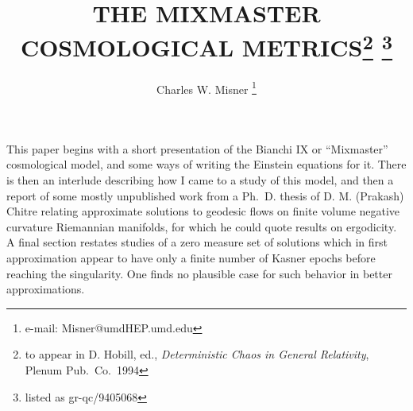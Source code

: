 \newcommand{\longbroken}{--- --- ---}
\newcommand{\chain}{--- $\cdot$ ---}
\newcommand{\dashddot}{--- $\cdot$ $\cdot$ ---}
\newcommand{\full}{------}
\let\lc=\lowercase
\let\uc=\uppercase
\newcommand{\Or}{\mathop{\rm O}\nolimits}
\newcommand{\Tr}{\mathop{\rm Tr}\nolimits}
\newcommand{\tr}{\mathop{\rm tr}\nolimits}
\newcommand{\ts}{\thinspace}
\newcommand{\bs}{\noalign{\vspace{7pt plus2pt minus2pt}}}
\newcommand{\0}{\phantom{0}}
\newcommand{\m}{\llap{$-$}}%
%
%
%
\newcommand{\APJ}{{\em Astrophys.\ J.} }
\newcommand{\APL}{{\em Astrophys.\ J. Lett.} }
\newcommand{\AP}{{\em Ann.\ Phys., Lpz.} }
\newcommand{\APNY}{{\em Ann.\ Phys., NY\/} }
\newcommand{\APP}{{\em Ann.\ Phys., Paris\/} }
\newcommand{\CJP}{{\em Can.\ J. Phys.} }
\newcommand{\CQG}{{\em Class.\ Quantum Grav.} }
\newcommand{\GRG}{{\em Gen.\ Rel.\ Grav.} }
\newcommand{\JP}{{\em J. Physique\/} }
\newcommand{\JPA}{{\em J. Phys.\ A: Math.\ Gen.} }
\newcommand{\JPD}{{\em J. Phys.\ D: Appl.\ Phys.} }
\newcommand{\JPSJ}{{\em J. Phys.\ Soc.\ Japan\/} }
\newcommand{\JMP}{{\em J. Math.\ Phys.} }
\newcommand{\NC}{{\em Nuovo Cimento\/} }
\newcommand{\NL}{{\em Nonlinearity\/} }
\newcommand{\NP}{{\em Nucl.\ Phys.} }
\newcommand{\PL}{{\em Phys.\ Lett.} }
\newcommand{\PR}{{\em Phys.\ Rev.} }
\newcommand{\PRL}{{\em Phys.\ Rev.\ Lett.} }
\newcommand{\PRS}{{\em Proc.\ R. Soc.} }
\newcommand{\PS}{{\em Phys.\ Scr.} }
\newcommand{\PTRS}{{\em Phil.\ Trans.\ R. Soc.} }
\newcommand{\RMP}{{\em Rev.\ Mod.\ Phys.} }
\newcommand{\RPP}{{\em Rep.\ Prog.\ Phys.} }
\newcommand{\RSI}{{\em Rev.\ Sci.\ Instrum.} }
\newcommand{\ZP}{{\em Z. Phys.} }
%
%
\makeatother









\title{THE MIXMASTER COSMOLOGICAL METRICS\footnote{to appear
                in D. Hobill, ed., {\em Deterministic Chaos
                in General Relativity}, Plenum Pub.\ Co.\ 1994}
                \footnote{listed as gr-qc/9405068}}

\author{Charles W. Misner \footnote{e-mail: Misner@umdHEP.umd.edu}}


\beginabstract
This paper begins with a short presentation of the Bianchi IX or
``Mixmaster'' cosmological model, and some ways of writing the
Einstein equations for it.  There is then an interlude describing how
I came to a study of this model, and then a report of some mostly
unpublished work from a Ph.\ D. thesis of D. M. (Prakash) Chitre
relating approximate solutions to geodesic flows on finite volume
negative curvature Riemannian manifolds, for which he could quote
results on ergodicity.  A final section restates studies of a
zero measure set of solutions which in first approximation appear to
have only a finite number of Kasner epochs before reaching the
singularity.  One finds no plausible case for such behavior in better
approximations.
\endabstract

